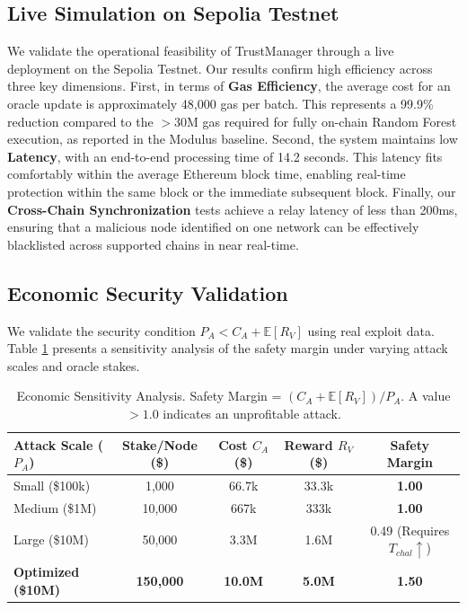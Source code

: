 \documentclass[runningheads]{llncs}
\begin{document}
\subsection{Live Simulation on Sepolia Testnet}
We validate the operational feasibility of TrustManager through a live deployment on the Sepolia Testnet. Our results confirm high efficiency across three key dimensions. First, in terms of \textbf{Gas Efficiency}, the average cost for an oracle update is approximately 48,000 gas per batch. This represents a 99.9\% reduction compared to the $>30$M gas required for fully on-chain Random Forest execution, as reported in the Modulus baseline. Second, the system maintains low \textbf{Latency}, with an end-to-end processing time of 14.2 seconds. This latency fits comfortably within the average Ethereum block time, enabling real-time protection within the same block or the immediate subsequent block. Finally, our \textbf{Cross-Chain Synchronization} tests achieve a relay latency of less than 200ms, ensuring that a malicious node identified on one network can be effectively blacklisted across supported chains in near real-time.

\subsection{Economic Security Validation}
We validate the security condition $P_A < C_A + \mathbb{E}[R_V]$ using real exploit data. Table \ref{tab:economic_sensitivity} presents a sensitivity analysis of the safety margin under varying attack scales and oracle stakes.

\begin{table}[htbp]
\centering
\caption{Economic Sensitivity Analysis. Safety Margin = $(C_A + \mathbb{E}[R_V]) / P_A$. A value $>1.0$ indicates an unprofitable attack.}
\label{tab:economic_sensitivity}
\begin{tabular}{lcccc}
\toprule
\textbf{Attack Scale ($P_A$)} & \textbf{Stake/Node (\$)} & \textbf{Cost $C_A$ (\$)} & \textbf{Reward $R_V$ (\$)} & \textbf{Safety Margin} \\
\midrule
Small (\$100k) & 1,000 & 66.7k & 33.3k & \textbf{1.00} \\
Medium (\$1M) & 10,000 & 667k & 333k & \textbf{1.00} \\
Large (\$10M) & 50,000 & 3.3M & 1.6M & 0.49 (Requires $T_{chal} \uparrow$) \\
\textbf{Optimized (\$10M)} & \textbf{150,000} & \textbf{10.0M} & \textbf{5.0M} & \textbf{1.50} \\
\bottomrule
\end{tabular}
\end{table}
\end{document}
